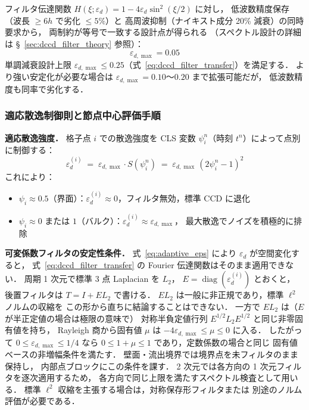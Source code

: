 フィルタ伝達関数 $H(\xi;\varepsilon_d) = 1 - 4\varepsilon_d\sin^2(\xi/2)$ に対し，
低波数精度保存（波長 $\geq 6h$ で劣化 $\leq 5\%$）と
高周波抑制（ナイキスト成分 20\% 減衰）の同時要求から，
両制約が等号で一致する設計点が得られる
（スペクトル設計の詳細は §~\ref{sec:dccd_filter_theory} 参照）：
\begin{equation}
  \boxed{\varepsilon_{d,\max} = 0.05}
  \label{eq:eps_max}
\end{equation}
単調減衰設計上限 $\varepsilon_{d,\max} \leq 0.25$（式~\eqref{eq:dccd_filter_transfer}）を満足する．
より強い安定化が必要な場合は $\varepsilon_{d,\max} = 0.10$〜$0.20$ まで拡張可能だが，
低波数精度も同率で劣化する．

\subsubsection{適応散逸制御則と節点中心評価手順}
\label{sec:dccd_adaptive}

\textbf{適応散逸強度．}
格子点 $i$ での散逸強度を CLS 変数 $\psi_i^n$（時刻 $t^n$）によって点別に制御する：
\begin{equation}
  \varepsilon_d^{(i)} \;=\; \varepsilon_{d,\max} \cdot S(\psi_i^n)
  \;=\; \varepsilon_{d,\max}\,(2\psi_i^n - 1)^2
  \label{eq:adaptive_eps}
\end{equation}
これにより：
\begin{itemize}
  \item $\psi_i \approx 0.5$（界面）：$\varepsilon_d^{(i)} \approx 0$，フィルタ無効，標準 CCD に退化
  \item $\psi_i \approx 0$ または $1$（バルク）：$\varepsilon_d^{(i)} \approx \varepsilon_{d,\max}$，
        最大散逸でノイズを積極的に排除
\end{itemize}

\medskip\noindent\textbf{可変係数フィルタの安定性条件．}
式~\eqref{eq:adaptive_eps} により $\varepsilon_d$ が空間変化すると，
式~\eqref{eq:dccd_filter_transfer} の Fourier 伝達関数はそのまま適用できない．
周期 1 次元で標準 3 点 Laplacian を $L_2$，
$E=\operatorname{diag}(\varepsilon_d^{(i)})$ とおくと，
後置フィルタは $T=I+E L_2$ で書ける．
$E L_2$ は一般に非正規であり，標準 $\ell^2$ ノルムの収縮を
この形から直ちに結論することはできない．
一方で $E L_2$ は（$E$ が半正定値の場合は極限の意味で）
対称半負定値行列 $E^{1/2}L_2E^{1/2}$ と同じ非零固有値を持ち，
Rayleigh 商から固有値 $\mu$ は $-4\varepsilon_{d,\max}\le\mu\le0$ に入る．
したがって $0\le\varepsilon_{d,\max}\le1/4$ なら
$0\le 1+\mu\le1$ であり，定数係数の場合と同じ
固有値ベースの非増幅条件を満たす．
壁面・流出境界では境界点を未フィルタのまま保持し，
内部点ブロックにこの条件を課す．
2 次元では各方向の 1 次元フィルタを逐次適用するため，
各方向で同じ上限を満たすスペクトル検査として用いる．
標準 $\ell^2$ 収縮を主張する場合は，対称保存形フィルタまたは
別途のノルム評価が必要である．

